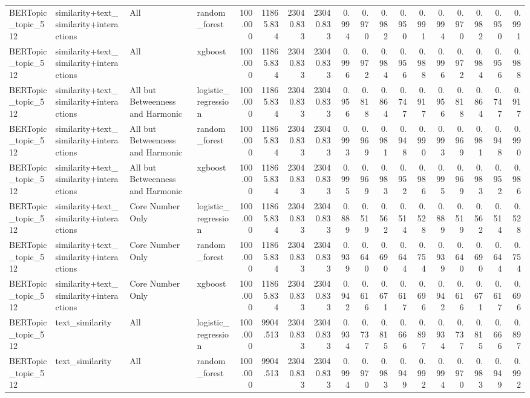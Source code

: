 \begin{tabular}{llllrrrrrrrrrrrrrr}
BERTopic\_topic\_512 & similarity+text\_similarity+interactions & All & random\_forest & 100.000 & 11865.834 & 23040.833 & 23040.833 & 0.994 & 0.970 & 0.982 & 0.950 & 0.991 & 0.994 & 0.970 & 0.982 & 0.950 & 0.991 \\
BERTopic\_topic\_512 & similarity+text\_similarity+interactions & All & xgboost & 100.000 & 11865.834 & 23040.833 & 23040.833 & 0.996 & 0.972 & 0.984 & 0.956 & 0.988 & 0.996 & 0.972 & 0.984 & 0.956 & 0.988 \\
BERTopic\_topic\_512 & similarity+text\_similarity+interactions & All but Betweenness and Harmonic & logistic\_regression & 100.000 & 11865.834 & 23040.833 & 23040.833 & 0.956 & 0.818 & 0.864 & 0.747 & 0.917 & 0.956 & 0.818 & 0.864 & 0.747 & 0.917 \\
BERTopic\_topic\_512 & similarity+text\_similarity+interactions & All but Betweenness and Harmonic & random\_forest & 100.000 & 11865.834 & 23040.833 & 23040.833 & 0.993 & 0.969 & 0.981 & 0.948 & 0.990 & 0.993 & 0.969 & 0.981 & 0.948 & 0.990 \\
BERTopic\_topic\_512 & similarity+text\_similarity+interactions & All but Betweenness and Harmonic & xgboost & 100.000 & 11865.834 & 23040.833 & 23040.833 & 0.995 & 0.969 & 0.983 & 0.952 & 0.986 & 0.995 & 0.969 & 0.983 & 0.952 & 0.986 \\
BERTopic\_topic\_512 & similarity+text\_similarity+interactions & Core Number Only & logistic\_regression & 100.000 & 11865.834 & 23040.833 & 23040.833 & 0.889 & 0.519 & 0.562 & 0.514 & 0.528 & 0.889 & 0.519 & 0.562 & 0.514 & 0.528 \\
BERTopic\_topic\_512 & similarity+text\_similarity+interactions & Core Number Only & random\_forest & 100.000 & 11865.834 & 23040.833 & 23040.833 & 0.939 & 0.640 & 0.690 & 0.644 & 0.754 & 0.939 & 0.640 & 0.690 & 0.644 & 0.754 \\
BERTopic\_topic\_512 & similarity+text\_similarity+interactions & Core Number Only & xgboost & 100.000 & 11865.834 & 23040.833 & 23040.833 & 0.942 & 0.616 & 0.671 & 0.617 & 0.696 & 0.942 & 0.616 & 0.671 & 0.617 & 0.696 \\
BERTopic\_topic\_512 & text\_similarity & All & logistic\_regression & 100.000 & 9904.513 & 23040.833 & 23040.833 & 0.934 & 0.737 & 0.815 & 0.666 & 0.897 & 0.934 & 0.737 & 0.815 & 0.666 & 0.897 \\
BERTopic\_topic\_512 & text\_similarity & All & random\_forest & 100.000 & 9904.513 & 23040.833 & 23040.833 & 0.994 & 0.970 & 0.983 & 0.949 & 0.992 & 0.994 & 0.970 & 0.983 & 0.949 & 0.992 \\

\end{tabular}
